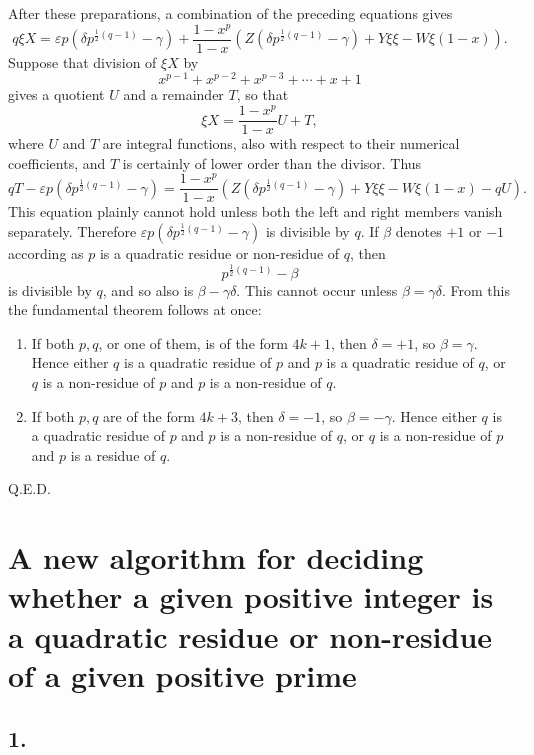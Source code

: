 \documentclass[12pt]{article}
\begin{document}
After these preparations, a combination of the preceding equations gives
\[
q\xi X=\varepsilon p\left(\delta p^{\frac12(q-1)}-\gamma\right)
+\frac{1-x^p}{1-x}\left(Z\left(\delta p^{\frac12(q-1)}-\gamma\right)+Y\xi\xi-W\xi(1-x)\right).
\]
Suppose that division of $\xi X$ by
\[
x^{p-1}+x^{p-2}+x^{p-3}+\cdots+x+1
\]
gives a quotient $U$ and a remainder $T$, so that
\[
\xi X=\frac{1-x^p}{1-x}U+T,
\]
where $U$ and $T$ are integral functions, also with respect to their numerical coefficients, and $T$ is certainly of lower order than the divisor. Thus
\[
qT-\varepsilon p\left(\delta p^{\frac12(q-1)}-\gamma\right)
=\frac{1-x^p}{1-x}\left(Z\left(\delta p^{\frac12(q-1)}-\gamma\right)+Y\xi\xi-W\xi(1-x)-qU\right).
\]
This equation plainly cannot hold unless both the left and right members vanish separately. Therefore $\varepsilon p(\delta p^{\frac12(q-1)}-\gamma)$ is divisible by $q$. If $\beta$ denotes $+1$ or $-1$ according as $p$ is a quadratic residue or non-residue of $q$, then
\[
p^{\frac12(q-1)}-\beta
\]
is divisible by $q$, and so also is $\beta-\gamma\delta$. This cannot occur unless $\beta=\gamma\delta$. From this the fundamental theorem follows at once:
\begin{enumerate}[label=\Roman*.]
\item If both $p,q$, or one of them, is of the form $4k+1$, then $\delta=+1$, so $\beta=\gamma$. Hence either $q$ is a quadratic residue of $p$ and $p$ is a quadratic residue of $q$, or $q$ is a non-residue of $p$ and $p$ is a non-residue of $q$.
\item If both $p,q$ are of the form $4k+3$, then $\delta=-1$, so $\beta=-\gamma$. Hence either $q$ is a quadratic residue of $p$ and $p$ is a non-residue of $q$, or $q$ is a non-residue of $p$ and $p$ is a residue of $q$.
\end{enumerate}
Q.E.D.

\section*{A new algorithm for deciding whether a given positive integer is a quadratic residue or non-residue of a given positive prime}

\subsection*{1.}
\end{document}

